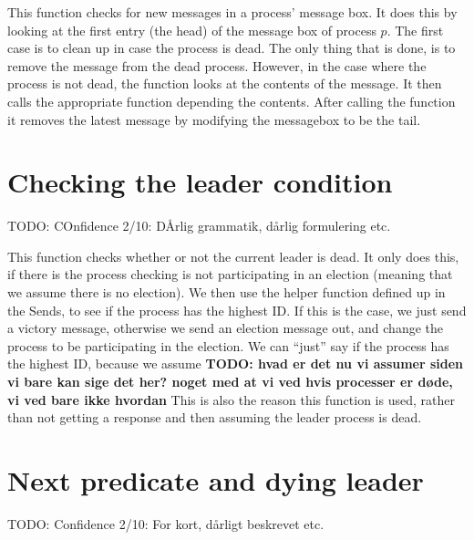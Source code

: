 \documentclass{report}
\begin{document}
\begin{calloutgreen}
\begin{calloutyellow}
This function checks for new messages in a process' message box. It does this by looking at the first entry (the head) of the message box of process $p$. The first case is to clean up in case the process is dead. The only thing that is done, is to remove the message from the dead process. However, in the case where the process is not dead, the function looks at the contents of the message. It then calls the appropriate function depending the contents. After calling the function it removes the latest message by modifying the messagebox to be the tail.

\section{Checking the leader condition}
TODO: COnfidence 2/10: DÅrlig grammatik, dårlig formulering etc.\\
\noindent{}

This function checks whether or not the current leader is dead. It only does this, if there is the process checking is not participating in an election (meaning that we assume there is no election). We then use the helper function defined up in the Sends, to see if the process has the highest ID. If this is the case, we just send a victory message, otherwise we send an election message out, and change the process to be participating in the election.
We can ``just'' say if the process has the highest ID, because we assume \textbf{TODO: hvad er det nu vi assumer siden vi bare kan sige det her? noget med at vi ved hvis processer er døde, vi ved bare ikke hvordan}
This is also the reason this function is used, rather than not getting a response and then assuming the leader process is dead.

\section{Next predicate and dying leader}
\begin{callout}
TODO: Confidence 2/10: For kort, dårligt beskrevet etc.
\end{callout}

\noindent{}



\end{calloutyellow}
\end{calloutgreen}
\end{document}
